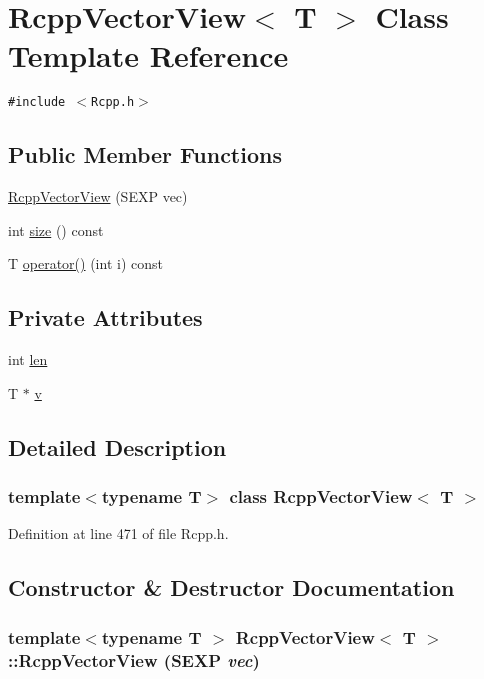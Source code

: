 \hypertarget{classRcppVectorView}{
\section{RcppVectorView$<$ T $>$ Class Template Reference}
\label{classRcppVectorView}
}
{\tt \#include $<$Rcpp.h$>$}

\subsection*{Public Member Functions}
\begin{CompactItemize}
\item 
\hyperlink{classRcppVectorView_d2e90fed8ee8a40f56591cc94f83041e}{RcppVectorView} (SEXP vec)
\item 
int \hyperlink{classRcppVectorView_d4c0f21296eb1cf7b2e2c8b8b43f4b0d}{size} () const 
\item 
T \hyperlink{classRcppVectorView_13d63e990363a37ae29e0eab7400d297}{operator()} (int i) const 
\end{CompactItemize}
\subsection*{Private Attributes}
\begin{CompactItemize}
\item 
int \hyperlink{classRcppVectorView_da67f9b1481099e4a820deaf4648778b}{len}
\item 
T $\ast$ \hyperlink{classRcppVectorView_e3dc3546d0dd0e3de95800b7c91857e8}{v}
\end{CompactItemize}


\subsection{Detailed Description}
\subsubsection*{template$<$typename T$>$ class RcppVectorView$<$ T $>$}



Definition at line 471 of file Rcpp.h.

\subsection{Constructor \& Destructor Documentation}
\hypertarget{classRcppVectorView_d2e90fed8ee8a40f56591cc94f83041e}{
\subsubsection[{RcppVectorView}]{\setlength{\rightskip}{0pt plus 5cm}template$<$typename T $>$ {\bf RcppVectorView}$<$ T $>$::{\bf RcppVectorView} (SEXP {\em vec})}}
\label{classRcppVectorView_d2e90fed8ee8a40f56591cc94f83041e}




